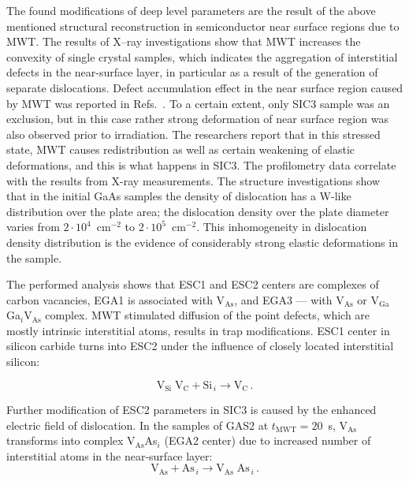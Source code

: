 \documentclass[%
 aip,jap,
 amsmath,amssymb,
 reprint,%
]{revtex4-1}
\begin{document}
The found modifications of deep level parameters are the result of the above mentioned
structural reconstruction in semiconductor near surface regions  due to MWT.
The results of X--ray investigations show that MWT increases the convexity of single crystal samples,
which indicates the aggregation of interstitial defects in the near-surface layer,
in particular as a result of the generation of separate dislocations. \cite{BoltovetsEn,Konakova2012FTPEn}
Defect accumulation effect in the near surface region caused by MWT was reported in Refs.~.
To a certain extent, only SIC3 sample was an exclusion, but in this case rather strong deformation of near surface region was also observed prior to irradiation.
The researchers report \cite{Bacherikov2003En,Pashkov1994En,BoltovetsEn,Milenin1994En,BelyaevIntac} that in this stressed state,
MWT causes redistribution as well as certain weakening of elastic deformations, and this is what happens in SIC3.
The profilometry data correlate with the results from X-ray measurements.
The structure investigations show that
in the initial GaAs samples the density of dislocation has a W-like distribution over the plate area; the dislocation density over the plate diameter varies from $2\cdot10^{4}$~cm$^{-2}$ to $2\cdot10^{5}$~cm$^{-2}$.
This inhomogeneity in dislocation density distribution is the evidence of considerably strong elastic deformations in the sample.

The performed analysis shows that ESC1 and ESC2 centers are complexes of carbon vacancies,
EGA1 is associated with V$_\mathrm{As}$,
and EGA3 — with V$_\mathrm{As}$ or  V$_\mathrm{Ga}$Ga$_i$V$_\mathrm{As}$ complex.
MWT stimulated diffusion of the point defects, which are mostly intrinsic interstitial atoms, results in trap modifications.
ESC1 center in silicon carbide turns into ESC2 under the influence of closely located interstitial silicon:

\begin{displaymath}
  \mathrm{V}_\mathrm{Si}\;\mathrm{V}_\mathrm{C}+\mathrm{Si}_{\,i} \rightarrow
   \mathrm{V}_\mathrm{C}\,.
\end{displaymath}

Further modification of ESC2 parameters in SIC3 is caused by the enhanced electric field of dislocation.
In the samples of GAS2 at $t_\mathrm{MWT}=20$~s,
V$_\mathrm{As}$ transforms into complex V$_\mathrm{As}$As$_i$
(EGA2 center)
due to increased number of interstitial atoms in the near-surface layer:
\begin{displaymath}
\mathrm{V}_\mathrm{As}+ \mathrm{As}_{\,i} \rightarrow \mathrm{V}_\mathrm{As}\;\mathrm{As}_{\,i}\,.
\end{displaymath}
\end{document}
